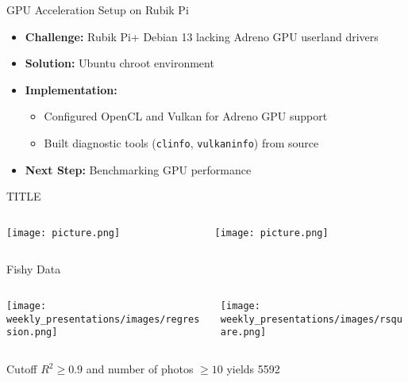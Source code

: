 \begin{frame}{GPU Acceleration Setup on Rubik Pi}
   \begin{itemize}
       \item \textbf{Challenge:} Rubik Pi+ Debian 13 lacking Adreno GPU userland drivers
       \item \textbf{Solution:} Ubuntu chroot environment 
       \item \textbf{Implementation:}
           \begin{itemize}
               \item Configured OpenCL and Vulkan for Adreno GPU support
               \item Built diagnostic tools (\texttt{clinfo}, \texttt{vulkaninfo}) from source
           \end{itemize}
       \item \textbf{Next Step:} Benchmarking GPU performance
   \end{itemize}
\end{frame}

\begin{frame}{TITLE}
    \begin{columns}
        \begin{column}{0.5\textwidth}
            \texttt{[image: picture.png]}
        \end{column}
        \begin{column}{0.5\textwidth}
            \texttt{[image: picture.png]}
        \end{column}
    \end{columns}
\end{frame}

\begin{frame}{Fishy Data}
    \begin{columns}
        \begin{column}{0.5\textwidth}
            \texttt{[image: weekly\_presentations/images/regression.png]}
        \end{column}
        \begin{column}{0.5\textwidth}
            \texttt{[image: weekly\_presentations/images/rsquare.png]}
        \end{column}
    \end{columns}

    \vspace{0.2em} %
    \begin{center}
        {\small Cutoff $R^2\geq 0.9$ and number of photos $\geq 10$ yields 5592}
    \end{center}
\end{frame}

